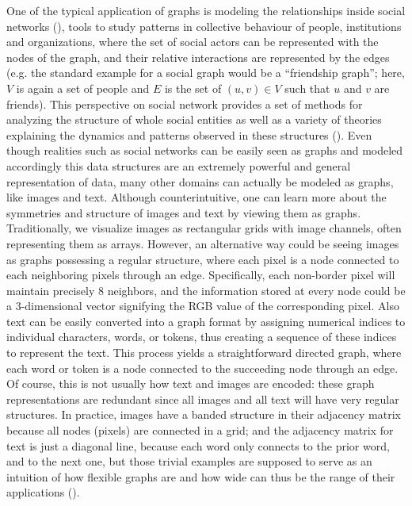 \documentclass[binding=0.6cm]{sapthesis}
\newcommand{\mycite}[1]{(\cite{#1})}
\begin{document}
One of the typical application of graphs is modeling the relationships inside social networks \mycite{Wu_Lian_Xu_Wu_Chen_2020}, tools to study patterns in collective behaviour of people, institutions and organizations, where the set of social actors can be represented with the nodes of the graph, and their relative interactions are represented by the edges (e.g. the standard example for a social graph would be a “friendship graph”; here, $V$ is again a set of people and $E$ is the set of $(u, v) \in V$ such that $u$ and $v$ are friends). This perspective on social network provides a set of methods for analyzing the structure of whole social entities as well as a variety of theories explaining the dynamics and patterns observed in these structures \mycite{wasserman_faust_1994}. Even though realities such as social networks can be easily seen as graphs and modeled accordingly this data structures are an extremely powerful and general representation of data, many other domains can actually be modeled as graphs, like images and text. Although counterintuitive, one can learn more about the symmetries and structure of images and text by viewing them as graphs. 
Traditionally, we visualize images as rectangular grids with image channels, often representing them as arrays. However, an alternative way could be seeing images as graphs possessing a regular structure, where each pixel is a node connected to each neighboring pixels through an edge. Specifically, each non-border pixel will maintain precisely 8 neighbors, and the information stored at every node could be a 3-dimensional vector signifying the RGB value of the corresponding pixel. Also text can be easily converted into a graph format by assigning numerical indices to individual characters, words, or tokens, thus creating a sequence of these indices to represent the text. This process yields a straightforward directed graph, where each word or token is a node connected to the succeeding node through an edge. Of course, this is not usually how text and images are encoded: these graph representations are redundant since all images and all text will have very regular structures. In practice, images have a banded structure in their adjacency matrix because all nodes (pixels) are connected in a grid; and the adjacency matrix for text is just a diagonal line, because each word only connects to the prior word, and to the next one, but those trivial examples are supposed to serve as an intuition of how flexible graphs are and how wide can thus be the range of their applications \mycite{distilPub-sanchez-lengeling2021a}.
\end{document}
